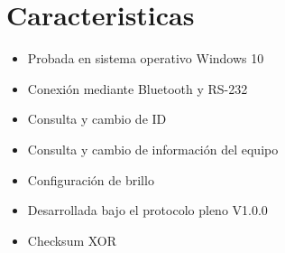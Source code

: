 \chapter{Caracteristicas}

\begin{itemize}
	\item Probada en sistema operativo Windows 10
	\item Conexión mediante Bluetooth y RS-232
	\item Consulta y cambio de ID
	\item Consulta y cambio de información del equipo
	\item Configuración de brillo
	\item Desarrollada bajo el protocolo pleno V1.0.0
	\item Checksum XOR
\end{itemize}
